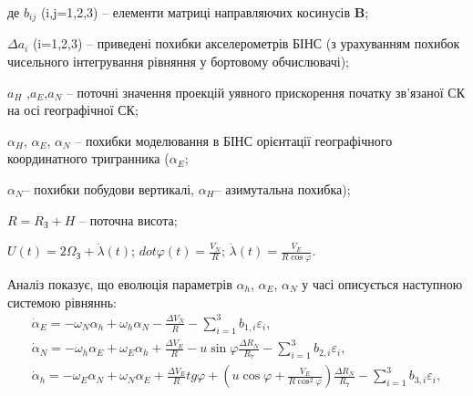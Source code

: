 \begin{ESKDexplanation}
\item де $b_{ij}$ (i,j=1,2,3) -- елементи матриці направляючих косинусів \textbf{B}; 
\item $\Delta a_{i}$ (i=1,2,3) -- приведені похибки акселерометрів БІНС (з урахуванням 
похибок чисельного інтегрування рівняння  у бортовому обчислювачі); 
\item $a_{H}$ ,$a_{E}$,$a_{N}$ -- поточні значення проекцій уявного прискорення початку зв'язаної СК на 
осі географічної СК; 
\item $\alpha_{H}$, $\alpha_{E}$, $\alpha_{N}$ -- похибки моделювання 
в БІНС орієнтації географічного координатного тригранника ($\alpha_{E} $;
\item $\alpha_{N} $-- похибки побудови вертикалі, $\alpha_{H} $-- азимутальна похибка); 
\item $R=R_{\text{З}} +H$ -- поточна висота; 
\item $U(t)=2\Omega_{\text{З}} +\dot{\lambda }(t)$; $dot{\varphi}(t)=\frac{V_{N}}{R}$; $\dot{\lambda }(t)=\frac{V_{E}}{R\cos \varphi }.$ 
\end{ESKDexplanation}
  Аналіз показує, що еволюція параметрів $\alpha_{h}$, $\alpha_{E}$, $\alpha_{N}$ у часі описується наступною системою рівняннь:
\begin{equation} 
\label{eq:dasdins} \begin{array}{l} 
{\dot{\alpha }_{E} =-\omega_{N} \alpha_{h} +\omega_{h} \alpha_{N} -\frac{\Delta V_{N} }{R} -\sum_{i=1}^{3}b_{1,i}\varepsilon_{i} ,} \\
{\dot{\alpha }_{N} =-\omega_{h} \alpha_{E} +\omega_{E} \alpha_{h} +\frac{\Delta V_{E} }{R} -u\sin \varphi \frac{\Delta R_{N} }{R_{7} }
-\sum_{i=1}^{3}b_{2,i}  \varepsilon_{i} ,} \\ 
{\dot{\alpha }_{h} =-\omega_{E} \alpha_{N} +\omega_{N} \alpha_{E} +\frac{\Delta V_{E} }{R} tg\varphi +(u\cos \varphi +\frac{V_{E} }{R\cos ^{2} \varphi } )
\frac{\Delta R_{N} }{R_{7} } -\sum_{i=1}^{3}b_{3,i}\varepsilon_{i} ,} \end{array} \end{equation} 

